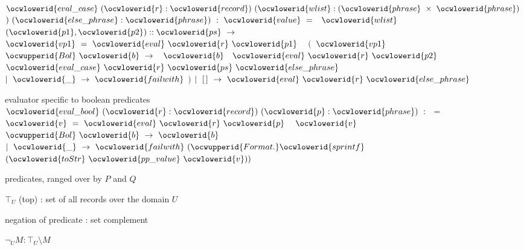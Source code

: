 \documentclass[12pt]{article}
\begin{document}
\ocwindent{0.50em}
~$\ocwlowerid{eval\_case}~(\ocwlowerid{r}:\ocwlowerid{record})~(\ocwlowerid{wlist}:(\ocwlowerid{phrase}~\times{}~\ocwlowerid{phrase})~$$)~(\ocwlowerid{else\_phrase}:\ocwlowerid{phrase})~:~\ocwlowerid{value}~=$\ocweol
\ocwindent{1.00em}
~$\ocwlowerid{wlist}~$\ocweol
\ocwindent{2.00em}
$(\ocwlowerid{p1},\ocwlowerid{p2})::\ocwlowerid{ps}~\rightarrow{}$\ocweol
\ocwindent{3.00em}
~$\ocwlowerid{vp1}~=~\ocwlowerid{eval}~\ocwlowerid{r}~\ocwlowerid{p1}~$~\ocweol
\ocwindent{2.50em}
$($~$\ocwlowerid{vp1}~$~\ocweol
\ocwindent{4.00em}
$\ocwupperid{Bol}~\ocwlowerid{b}~\rightarrow{}$\ocweol
\ocwindent{5.00em}
~$\ocwlowerid{b}~$~$\ocwlowerid{eval}~\ocwlowerid{r}~\ocwlowerid{p2}$\ocweol
\ocwindent{5.00em}
~$\ocwlowerid{eval\_case}~\ocwlowerid{r}~\ocwlowerid{ps}~\ocwlowerid{else\_phrase}$\ocweol
\ocwindent{3.00em}
$\mid{}~\ocwlowerid{\_}~\rightarrow{}~\ocwlowerid{failwith}~$$)$\ocweol
\ocwindent{1.00em}
$\mid{}~[\,]~\rightarrow{}~\ocwlowerid{eval}~\ocwlowerid{r}~\ocwlowerid{else\_phrase}$\medskip

\ocwendcode{}\ocwindent{0.00em}
evaluator specific to boolean predicates 
\ocweol
\label{rellens.ml:6276}%
\medskip
\ocwbegincode{}\ocwindent{0.00em}
~$\ocwlowerid{eval\_bool}~(\ocwlowerid{r}:\ocwlowerid{record})~(\ocwlowerid{p}:\ocwlowerid{phrase})~:~$~=\ocweol
\ocwindent{1.00em}
~$\ocwlowerid{v}~=~\ocwlowerid{eval}~\ocwlowerid{r}~\ocwlowerid{p}~$\ocweol
\ocwindent{1.00em}
~$\ocwlowerid{v}~$~$\ocwupperid{Bol}~\ocwlowerid{b}~\rightarrow{}~\ocwlowerid{b}$\ocweol
\ocwindent{1.00em}
$\mid{}~\ocwlowerid{\_}~\rightarrow{}~\ocwlowerid{failwith}~(\ocwupperid{Format.}\ocwlowerid{sprintf}~$~$(\ocwlowerid{toStr}~\ocwlowerid{pp\_value}~\ocwlowerid{v}))$\medskip

\ocwendcode{}\ocwindent{0.00em}
predicates, ranged over by $P$ and $Q$

  $\top_U$ (top) : set of all records over the domain $U$

  negation of predicate : set complement

  $\neg_U M : \top_U \setminus M$ 
\end{document}
